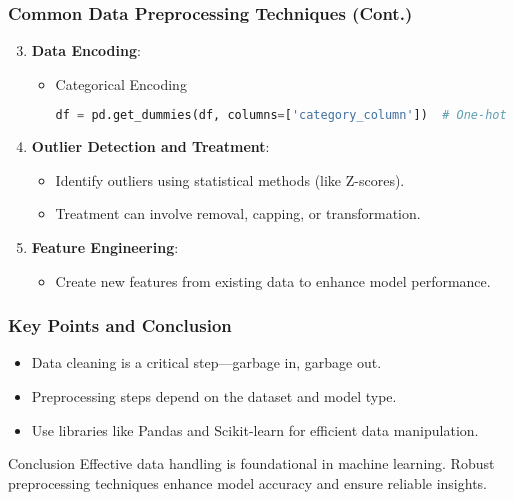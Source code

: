 \documentclass[aspectratio=169]{beamer}
\begin{document}
\begin{frame}[fragile]
    \frametitle{Common Data Preprocessing Techniques (Cont.)}
    \begin{enumerate}
        \setcounter{enumi}{2}
        \item \textbf{Data Encoding}:
        \begin{itemize}
            \item Categorical Encoding
            \begin{lstlisting}[language=Python]
df = pd.get_dummies(df, columns=['category_column'])  # One-hot encoding
            \end{lstlisting}
        \end{itemize}
        
        \item \textbf{Outlier Detection and Treatment}:
        \begin{itemize}
            \item Identify outliers using statistical methods (like Z-scores).
            \item Treatment can involve removal, capping, or transformation.
        \end{itemize}

        \item \textbf{Feature Engineering}: 
        \begin{itemize}
            \item Create new features from existing data to enhance model performance.
        \end{itemize}
    \end{enumerate}
\end{frame}

\begin{frame}[fragile]
    \frametitle{Key Points and Conclusion}
    \begin{itemize}
        \item Data cleaning is a critical step—garbage in, garbage out.
        \item Preprocessing steps depend on the dataset and model type.
        \item Use libraries like Pandas and Scikit-learn for efficient data manipulation.
    \end{itemize}
    
    \begin{block}{Conclusion}
        Effective data handling is foundational in machine learning. Robust preprocessing techniques enhance model accuracy and ensure reliable insights.
    \end{block}
\end{frame}
\end{document}
